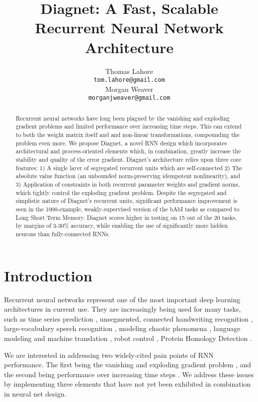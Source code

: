 \documentclass{article}
\title{Diagnet: A Fast, Scalable Recurrent Neural Network Architecture}
\author{
Thomas Lahore\\
\texttt{tom.lahore@gmail.com}\\
\And
Morgan Weaver\\
\texttt{morganjweaver@gmail.com}
}
\begin{document}
\maketitle
\begin{abstract}

  Recurrent neural networks have long been plagued by the vanishing and exploding gradient problems and limited performance over increasing time steps. This can extend to both the weight matrix itself and and non-linear transformations, compounding the problem even more. We propose Diagnet, a novel RNN design which incorporates architectural and process-oriented elements which, in combination, greatly increase the stability and quality of the error gradient. Diagnet’s architecture relies upon three core features: 1) A single layer of segregated recurrent units which are self-connected 2) The absolute value function (an unbounded norm-preserving idempotent nonlinearity), and 3) Application of constraints in both recurrent parameter weights and gradient norms, which tightly control the exploding gradient problem.  Despite the segregated and simplistic nature of Diagnet's recurrent units, significant performance improvement is seen in the 1000-example, weakly-supervised version of the bAbI tasks as compared to Long Short Term Memory. Diagnet scores higher in testing on 15 out of the 20 tasks, by margins of 3-30\% accuracy, while enabling the use of significantly more hidden neurons than fully-connected RNNs. 

\end{abstract}

\section{Introduction}

Recurrent neural networks represent one of the most important deep learning architectures in current use.  They are increasingly being used for many tasks, such as time series prediction \citet{Giles2001}, unsegmented, connected handwriting recognition \citet{graves2009offline}, large-vocabulary speech recognition \citet{DBLP:journals/corr/SakSB14}, modeling chaotic phenomena \citet{PhysRevLett.120.024102}, language modeling and machine translation \citet{bahdanau2014neural, mikolov2010recurrent}, robot control \citet{oubbati2005kinematic}, Protein Homology Detection \citet{el2008predicting}.
      
We are interested in addressing two widely-cited pain points of RNN performance.  The first being the vanishing and exploding gradient problem \citet{pascanu2013difficulty, bengio2013advances, pascanu2012understanding}, and the second being performance over increasing time steps \citet{gers1999learning, Hochreiter:1997:LSM:1246443.1246450}.  We address these issues by implementing three elements that have not yet been exhibited in combination in neural net design. 
\end{document}
